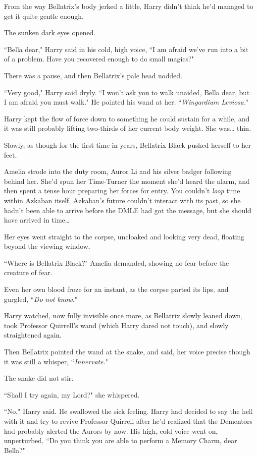 From the way Bellatrix's body jerked a little, Harry didn't think he'd managed to get it quite gentle enough.

The sunken dark eyes opened.

``Bella dear," Harry said in his cold, high voice, ``I am afraid we've run into a bit of a problem. Have you recovered enough to do small magics?"

There was a pause, and then Bellatrix's pale head nodded.

``Very good," Harry said dryly. ``I won't ask you to walk unaided, Bella dear, but I am afraid you must walk." He pointed his wand at her. ``\emph{Wingardium Leviosa.}"

Harry kept the flow of force down to something he could sustain for a while, and it was still probably lifting two-thirds of her current body weight. She was{\ldots} thin.

Slowly, as though for the first time in years, Bellatrix Black pushed herself to her feet.

\later

Amelia strode into the duty room, Auror Li and his silver badger following behind her. She'd spun her Time-Turner the moment she'd heard the alarm, and then spent a tense hour preparing her forces for entry. You couldn't \emph{loop} time within Azkaban itself, Azkaban's future couldn't interact with its past, so she hadn't been able to arrive before the DMLE had got the message, but she should have arrived in time{\ldots}

Her eyes went straight to the corpse, uncloaked and looking very dead, floating beyond the viewing window.

``Where is Bellatrix Black?" Amelia demanded, showing no fear before the creature of fear.

Even her own blood froze for an instant, as the corpse parted its lips, and gurgled, ``\emph{Do not know.}"

\later

Harry watched, now fully invisible once more, as Bellatrix slowly leaned down, took Professor Quirrell's wand (which Harry dared not touch), and slowly straightened again.

Then Bellatrix pointed the wand at the snake, and said, her voice precise though it was still a whisper, ``\emph{Innervate.}"

The snake did not stir.

``Shall I try again, my Lord?" she whispered.

``No," Harry said. He swallowed the sick feeling. Harry had decided to say the hell with it and try to revive Professor Quirrell after he'd realized that the Dementors had probably alerted the Aurors by now. His high, cold voice went on, unperturbed, ``Do you think you are able to perform a Memory Charm, dear Bella?"

